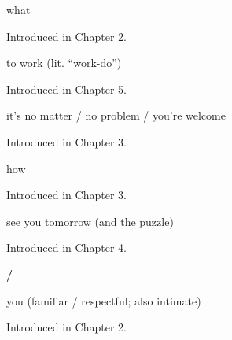 \noindent\begin{minipage}[t]{\linewidth}
\raggedright
\textbf{}\par
\small what\par
\footnotesize Introduced in Chapter 2.
\end{minipage}\par\medskip

\noindent\begin{minipage}[t]{\linewidth}
\raggedright
\textbf{ }\par
\small to work (lit. \textquotedblleft{}work-do\textquotedblright{})\par
\footnotesize Introduced in Chapter 5.
\end{minipage}\par\medskip

\noindent\begin{minipage}[t]{\linewidth}
\raggedright
\textbf{  }\par
\small it's no matter / no problem / you're welcome\par
\footnotesize Introduced in Chapter 3.
\end{minipage}\par\medskip

\noindent\begin{minipage}[t]{\linewidth}
\raggedright
\textbf{}\par
\small how\par
\footnotesize Introduced in Chapter 3.
\end{minipage}\par\medskip

\noindent\begin{minipage}[t]{\linewidth}
\raggedright
\textbf{  }\par
\small see you tomorrow (and the  puzzle)\par
\footnotesize Introduced in Chapter 4.
\end{minipage}\par\medskip

\noindent\begin{minipage}[t]{\linewidth}
\raggedright
\textbf{ / }\par
\small you (familiar / respectful; also  intimate)\par
\footnotesize Introduced in Chapter 2.
\end{minipage}\par\medskip

